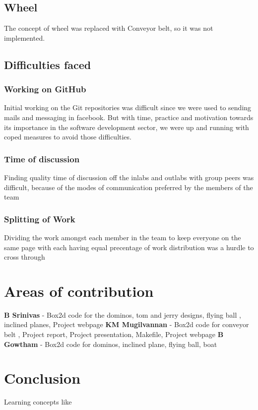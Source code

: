 \documentclass{article}
\begin{document}
    \subsection{Wheel}
        The concept of wheel was replaced with Conveyor belt, so it was not implemented.
    \subsection{Difficulties faced}
        \subsubsection{Working on GitHub}
            Initial working on the Git repositories was difficult since we were used to sending mails and messaging in facebook. But with time, practice and motivation towards its importance in the software development sector, we were up and running with coped measures to avoid those difficulties.  
        \subsubsection{Time of discussion}
            Finding quality time of discussion off the inlabs and outlabs with group peers was difficult, because of the modes of communication preferred by the members of the team
        \subsubsection{Splitting of Work}
            Dividing the work amongst each member in the team to keep everyone on the same page with each having equal precentage of work distribution was a hurdle to cross through 

\section{Areas of contribution}
    \textbf{B Srinivas} - Box2d code for the dominos, tom and jerry designs, flying ball \cite{box2d}, inclined planes, Project webpage \newline
    \indent \textbf{KM Mugilvannan} - Box2d code for conveyor belt \cite{box2d}, Project report, Project presentation, Makefile, Project webpage \newline 
    \indent \textbf{B Gowtham} - Box2d code for dominos, inclined plane, flying ball, boat \cite{box2d} \newline  

\section{Conclusion} \label{Conclusion}
    Learning concepts like
\end{document}
